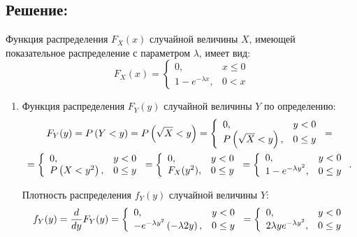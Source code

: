 \subsection*{Решение:}
Функция распределения $F_X(x)$ случайной величины $X$, имеющей показательное распределение с параметром $\lambda$, имеет вид:
\begin{equation}
    F_X(x)
    = \left \{
    \begin{array}{ll}
        0,                   & x \le 0 \\
        1 - e^{-\lambda x} , & 0 < x
    \end{array}
    \right .
\end{equation}

\begin{enumerate}
    \item Функция распределения $F_Y(y)$ случайной величины $Y$ по определению:
    \begin{multline*}
        F_Y(y) = P \left ( Y < y \right ) = P \left ( \sqrt{X} < y \right )
        = \left \{
        \begin{array}{ll}
            0 ,                         & y < 0   \\
            P \left ( \sqrt{X} < y \right ), & 0 \le y
        \end{array}
        \right . = \\
        = \left \{
        \begin{array}{ll}
            0 ,                    & y < 0   \\
            P \left ( X < y^2 \right ), & 0 \le y
        \end{array}
        \right .
        = \left \{
        \begin{array}{ll}
            0 ,       & y < 0   \\
            F_X(y^2), & 0 \le y
        \end{array}
        \right .
        = \left \{
        \begin{array}{ll}
            0 ,                    & y < 0   \\
            1 - e^{- \lambda y^2}, & 0 \le y
        \end{array}
        \right .
        .
    \end{multline*}

    Плотность распределения $f_Y(y)$ случайной величины $Y$:
    \begin{equation}
        f_Y(y)
        = \frac{d}{dy} F_Y(y)
        = \left \{
        \begin{array}{ll}
            0 ,                                                 & y < 0   \\
            - e^{- \lambda y^2} \left ( - \lambda 2 y \right ), & 0 \le y
        \end{array}
        \right .
        = \left \{
        \begin{array}{ll}
            0 ,                            & y < 0   \\
            2 \lambda y e^{- \lambda y^2}, & 0 \le y
        \end{array}
        \right .
    \end{equation}


\end{enumerate}
